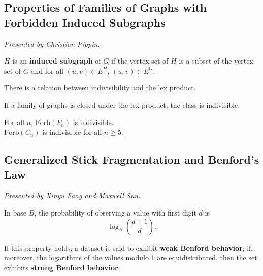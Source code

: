 \documentclass[12pt]{amsart}
\begin{document}
\newpage 

\subsection{Properties of Families of Graphs with Forbidden Induced Subgraphs}

\textit{}
\vspace{0.25cm}

\textit{Presented by Christian Pippin.}

\begin{definition}
$H$ is an \textbf{induced subgraph} of $G$ if the vertex set of $H$ is a subset of the vertex set of $G$ and for all $(u, v) \in E^{H}$, $(u, v) \in E^G.$
\end{definition}

There is a relation between indivisibility and the lex product. \\

\begin{lemma*}
If a family of graphs is closed under the lex product, the class is indivisible.
\end{lemma*}

\begin{theorem*}
For all $n$, $\mathrm{Forb}(P_n)$ is indivisible. \\

$\mathrm{Forb}(C_n)$ is indivisible for all $n \geq 5.$
\end{theorem*}

\vspace{2.5cm}

\subsection{Generalized Stick Fragmentation and Benford's Law}

\textit{}
\vspace{0.25cm}

\textit{Presented by Xinyu Fang and Maxwell Sun.}

\begin{theorem*}
In base $B$, the probability of observing a value with first digit $d$ is \[ \log_B\left(\frac{d+1}{d}\right).\]

If this property holds, a dataset is said to exhibit \textbf{weak Benford behavior}; if, moreover, the logarithms of the values modulo 1 are equidistributed, then the set exhibits \textbf{strong Benford behavior}. 
\end{theorem*}
\end{document}
